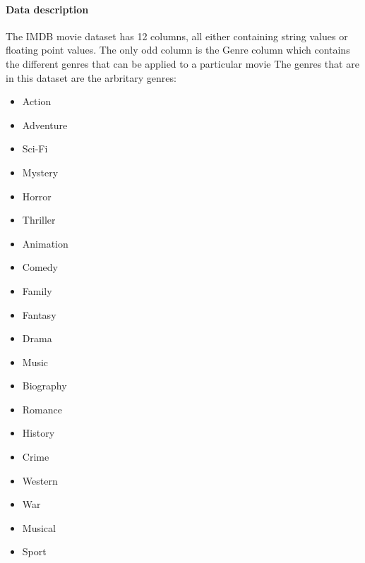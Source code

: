     \paragraph{Data description}
        The IMDB movie dataset has 12 columns, all either containing string values or floating point values.
        The only odd column is the Genre column which contains the different genres that can be applied to a particular movie
        The genres that are in this dataset are the arbritary genres: 
        \begin{multicols}{5}
            \begin{itemize}
                \item Action 
                \item Adventure 
                \item Sci-Fi 
                \item Mystery 
                \item Horror 
                \item Thriller 
                \item Animation 
                \item Comedy 
                \item Family 
                \item Fantasy 
                \item Drama 
                \item Music 
                \item Biography 
                \item Romance 
                \item History 
                \item Crime 
                \item Western 
                \item War 
                \item Musical 
                \item Sport
            \end{itemize}
        \end{multicols}
